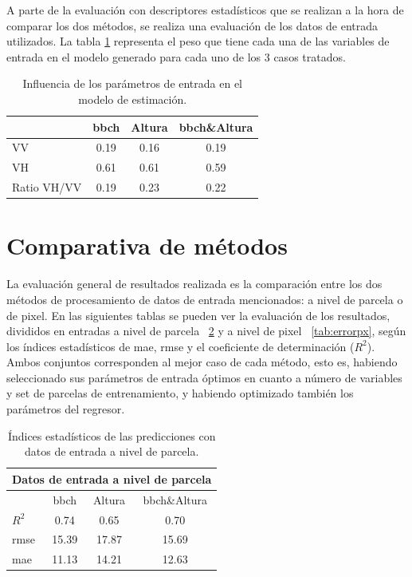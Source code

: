 \par A parte de la evaluación con descriptores estadísticos que se realizan a la hora de comparar los dos métodos, se realiza una evaluación de los datos de entrada utilizados. La tabla \ref{tab:p_imp_f} representa el peso que tiene cada una de las variables de entrada en el modelo generado para cada uno de los 3 casos tratados. 

\begin{table}[h]
\centering
\begin{tabular}{l|ccc}
               & \gls{bbch} & Altura & \gls{bbch}\&Altura \\ \hline \hline
VV             & 0.19 & 0.16   & 0.19         \\
VH             & 0.61 & 0.61   & 0.59         \\
Ratio VH/VV    & 0.19 & 0.23   & 0.22         
     
\end{tabular}
\caption{Influencia de los parámetros de entrada en el modelo de estimación. \label{tab:p_imp_f}}
\end{table}
\section{Comparativa de métodos}
\par La evaluación general de resultados realizada es la comparación entre los dos métodos de procesamiento de datos de entrada mencionados: a nivel de parcela o de pixel. En las siguientes tablas se pueden ver la evaluación de los resultados, divididos en entradas a nivel de parcela ~\ref{tab:errorpc} y a nivel de pixel ~\ref{tab:errorpx}, según los índices estadísticos de \gls{mae}, \gls{rmse} y el coeficiente de determinación ($R^2$). Ambos conjuntos corresponden al mejor caso de cada método, esto es, habiendo seleccionado sus parámetros de entrada óptimos en cuanto a número de variables y set de parcelas de entrenamiento, y habiendo optimizado también los parámetros del regresor.

\begin{table}[h]
\centering
\begin{tabular}{lccc}
\multicolumn{4}{c}{Datos de entrada a nivel de parcela}                            \\ \hline \hline
\multicolumn{1}{l|}{}                            & \gls{bbch}  & Altura & \gls{bbch}\&Altura \\ \cline{2-4} 
\multicolumn{1}{l|}{$R^2$}                       & 0.74  & 0.65   & 0.70 \\
\multicolumn{1}{l|}{\gls{rmse}} 				 & 15.39 & 17.87  & 15.69 \\
\multicolumn{1}{l|}{\gls{mae}}  				 & 11.13 & 14.21  & 12.63       
\end{tabular}
\caption{Índices estadísticos de las predicciones con datos de entrada a nivel de parcela. \label{tab:errorpc}}
\end{table}

